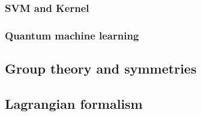 \subsubsection{SVM and Kernel}
\subsubsection{Quantum machine learning}

\subsection{Group theory and symmetries}

\subsection{Lagrangian formalism}\label{sec:lagrangian}
\cite{xuLagrangianFormalismQuantum2021}